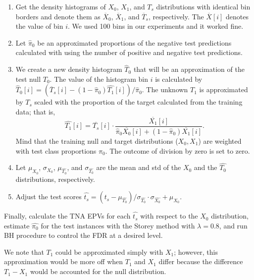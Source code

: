 \documentclass{article}
\begin{document}
\begin{enumerate}%
	\itemsep-3pt  		
	\item Get the density histograms of $X_0$, $X_1$, and $T_s$ distributions with identical bin borders and denote them as $\overline{X}_0$, $\overline{X}_1$, and $\overline{T}_s$, respectively. The $\overline{X}[i]$ denotes the value of bin $i$.  We used 100 bins in our experiments and it worked fine.
	
	\item Let $\hat{\pi}_0$ be an approximated proportions of the negative test predictions calculated with using the number of positive and negative test predictions. 
	
	\item We create a new density histogram $\hat{T}_0$ that will be an approximation of the test null $T_0$. The value of the histogram bin $i$ is calculated  by $\hat{T}_0[i] = (\overline{T}_s[i] -  (1-\hat{\pi}_0)\hat{T_1}[i])/\hat{\pi}_0$. The unknown $T_1$ is approximated by $T_s$ scaled with the proportion of the target calculated from the training data; that is, 
	$$\hat{T_1}[i] = \overline{T_s}[i]\cdot \frac {\overline{X_1}[i]}{\hat{\pi}_0 \overline{X_0}[i] + (1-\hat{\pi}_0) \overline{X_1}[i]}.$$ 
	Mind that the training null and target distributions ($X_0,X_1$) are weighted with test class proportions  $\hat{\pi}_0$. The outcome of division by zero is set to zero.
		
	\item Let $\mu_{X_0}$, $\sigma_{X_0}$, $\mu_{\hat{T_0}}$, and $\sigma_{\hat{T_0}}$ are the mean and std of the $X_0$ and the $\hat{T_0}$ distributions, respectively. 
	
	\item Adjust the test scores $\hat{t_s} = (t_s-\mu_{\hat{T_0}})/\sigma_{\hat{T_0}} \cdot \sigma_{\hat{X_0}} + \mu_{X_0}$.
\end{enumerate}

	Finally, calculate the TNA EPVs for each $\hat{t_s}$ with respect to the $X_0$ distribution, estimate  $\hat{\pi_0}$ for the test instances with the Storey method with $\lambda= 0.8$, and run BH procedure to control the FDR at a desired level. 
	
	We note that $T_1$ could be approximated simply with $X_1$; however, this approximation would be more off when $T_1$ and $X_1$ differ because the difference $T_1-X_1$ would be accounted for the null distribution.
	
	
\end{document}
